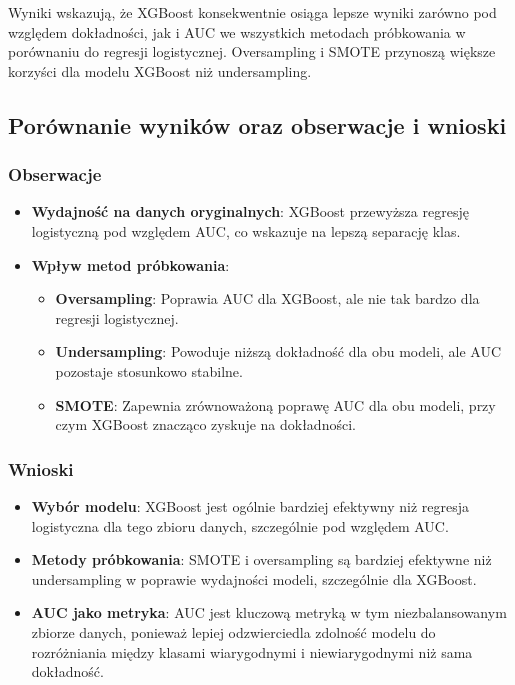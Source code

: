 \documentclass{article}
\begin{document}
Wyniki wskazują, że XGBoost konsekwentnie osiąga lepsze wyniki zarówno pod względem dokładności, jak i AUC we wszystkich metodach próbkowania w porównaniu do regresji logistycznej. Oversampling i SMOTE przynoszą większe korzyści dla modelu XGBoost niż undersampling.

\subsection{Porównanie wyników oraz obserwacje i wnioski}

\subsubsection{Obserwacje}
\begin{itemize}
    \item \textbf{Wydajność na danych oryginalnych}: XGBoost przewyższa regresję logistyczną pod względem AUC, co wskazuje na lepszą separację klas.
    \item \textbf{Wpływ metod próbkowania}:
    \begin{itemize}
        \item \textbf{Oversampling}: Poprawia AUC dla XGBoost, ale nie tak bardzo dla regresji logistycznej.
        \item \textbf{Undersampling}: Powoduje niższą dokładność dla obu modeli, ale AUC pozostaje stosunkowo stabilne.
        \item \textbf{SMOTE}: Zapewnia zrównoważoną poprawę AUC dla obu modeli, przy czym XGBoost znacząco zyskuje na dokładności.
    \end{itemize}
\end{itemize}

\subsubsection{Wnioski}
\begin{itemize}
    \item \textbf{Wybór modelu}: XGBoost jest ogólnie bardziej efektywny niż regresja logistyczna dla tego zbioru danych, szczególnie pod względem AUC.
    \item \textbf{Metody próbkowania}: SMOTE i oversampling są bardziej efektywne niż undersampling w poprawie wydajności modeli, szczególnie dla XGBoost.
    \item \textbf{AUC jako metryka}: AUC jest kluczową metryką w tym niezbalansowanym zbiorze danych, ponieważ lepiej odzwierciedla zdolność modelu do rozróżniania między klasami wiarygodnymi i niewiarygodnymi niż sama dokładność.
\end{itemize}
\end{document}
